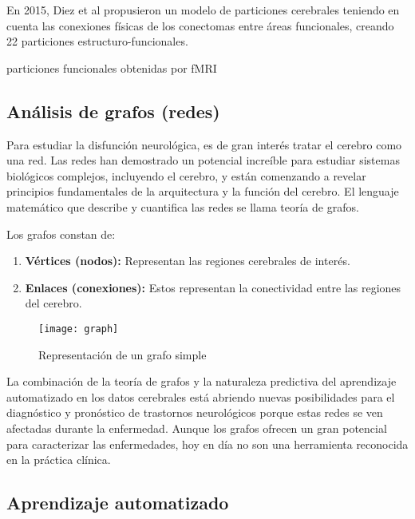 \documentclass[fleqn,10pt]{UICArticle} %
\begin{document}
En 2015, Diez et al \cite{Diez2015} propusieron un modelo de particiones cerebrales teniendo en cuenta las conexiones físicas de los conectomas entre áreas funcionales, creando 22 particiones estructuro-funcionales. 

particiones funcionales obtenidas por fMRI \cite{Heller2006}

\subsection{Análisis de grafos (redes)}


Para estudiar la disfunción neurológica, es de gran interés tratar el cerebro como una red. Las redes han demostrado un potencial increíble para estudiar sistemas biológicos complejos, incluyendo el cerebro, y están comenzando a revelar principios fundamentales de la arquitectura y la función del cerebro. El lenguaje matemático que describe y cuantifica las redes se llama teoría de grafos.

\vspace{3mm} 
Los grafos constan de:
\begin{enumerate}[noitemsep]
\item \textbf{Vértices (nodos):} Representan las regiones cerebrales de interés.
\item \textbf{Enlaces (conexiones):} Estos representan la conectividad entre las regiones del cerebro.
\end{enumerate}

\begin{figure}[ht]
	\centering
	\texttt{[image: graph]}
	\caption{Representación de un grafo simple}
	\label{fig:graph}
\end{figure}

La combinación de la teoría de grafos y la naturaleza predictiva del aprendizaje automatizado en los datos cerebrales está abriendo nuevas posibilidades para el diagnóstico y pronóstico de trastornos neurológicos porque estas redes se ven afectadas durante la enfermedad. Aunque los grafos ofrecen un gran potencial para caracterizar las enfermedades, hoy en día no son una herramienta reconocida en la práctica clínica.


\subsection{Aprendizaje automatizado}
\end{document}
